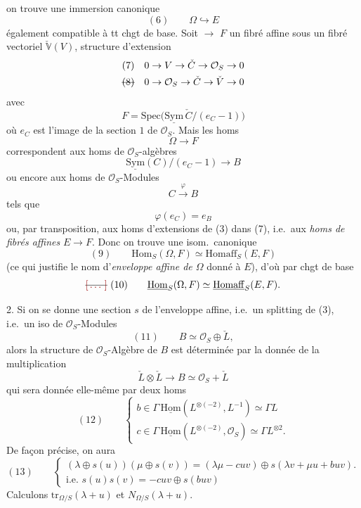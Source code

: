 \documentclass[11pt,a4paper]{article}
\begin{document}
on trouve une  immersion canonique
\[
(6)\qquad \Omega \hookrightarrow E
\]
également compatible à tt chgt de base. Soit  $\to$ $F$ un fibré affine sous un fibré vectoriel $\check{\mathbb{V}}(V)$,   structure d'extension \struck{\ill{}}
\[
\begin{aligned}
&(7) && 0 \to V \to \check{C} \to \mathcal{O}_S \to 0\\
&\text{\struck{(8)}} && 0 \to \mathcal{O}_S \to \check{C} \to \check{V} \to 0
\end{aligned}
\]
avec
\[
F = \mathrm{Spec}\bigl(\underline{\mathrm{Sym}}\, \check{C}/(e_C - 1)\bigr)
\]
où $e_C$ est l'image  de la section $1$ de $\mathcal{O}_S$. Mais les homs
\[
\Omega \longrightarrow F
\]
correspondent aux homs de $\mathcal{O}_S$-algèbres
\[
\underline{\mathrm{Sym}}(C)/(e_C - 1) \longrightarrow B
\]
ou encore aux homs de $\mathcal{O}_S$-Modules
\[
C \xrightarrow{\;\varphi\;} B
\]
tels que
\[
\varphi(e_C) = e_B
\]
ou, par transposition, aux homs d'extensions de (3) dans (7), i.e.\ aux \emph{homs de fibrés affines} $E \to F$. Donc on trouve une isom.\ canonique
\[
(9)\qquad \mathrm{Hom}_S(\Omega, F) \simeq \mathrm{Homaff}_S(E, F)
\]
(ce qui justifie le nom d'\emph{enveloppe affine de $\Omega$} donné à $E$), d'où par chgt de base
\[
\text{\struck{\ill{}}}\ (10)\qquad \underline{\mathrm{Hom}}_S(\Omega, F) \simeq \underline{\mathrm{Homaff}}_S(E, F) .
\]

2. Si on se donne une section $s$ de l'enveloppe affine, i.e.\ un splitting de (3), i.e.\ un iso de $\mathcal{O}_S$-Modules
\[
(11)\qquad B \simeq \mathcal{O}_S \oplus \check{L} ,
\]
alors la structure de $\mathcal{O}_S$-Algèbre de $B$ est déterminée par la donnée de la multiplication
\[
\check{L} \otimes \check{L} \longrightarrow B \simeq \mathcal{O}_S + \check{L}
\]
qui sera donnée elle-même par deux homs
\[
(12)\qquad
\begin{cases}
b \in \Gamma\,\underline{\mathrm{Hom}}(L^{\otimes(-2)}, L^{-1}) \simeq \Gamma L\\
c \in \Gamma\,\underline{\mathrm{Hom}}(L^{\otimes(-2)}, \mathcal{O}_S) \simeq \Gamma L^{\otimes 2} .
\end{cases}
\]
De façon précise, on aura
\[
(13)\qquad
\begin{cases}
(\lambda \oplus s(u))(\mu \oplus s(v)) = (\lambda\mu - cuv) \oplus s(\lambda v + \mu u + buv) .\\
\text{i.e. } s(u)s(v) = -cuv \oplus s(buv)
\end{cases}
\]
 Calculons $\mathrm{tr}_{\Omega/S}(\lambda + u)$ et $N_{\Omega/S}(\lambda + u)$.
\end{document}
